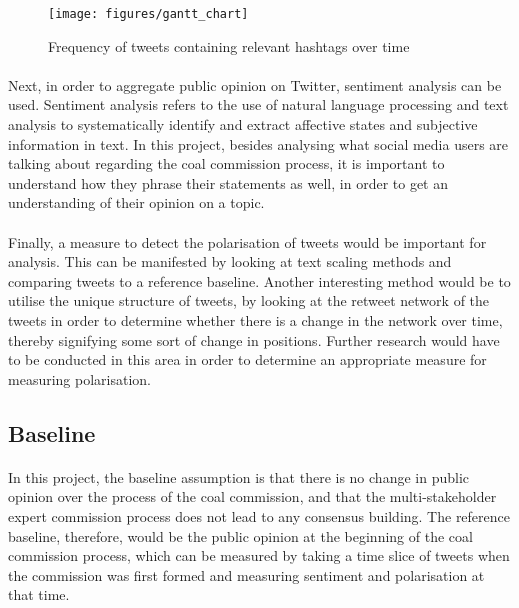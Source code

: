\documentclass[10pt,twocolumn,letterpaper]{article}
\begin{document}
\begin{figure} 
	\begin{center}
		\texttt{[image: figures/gantt\_chart]}
	\end{center}
	\caption{Frequency of tweets containing relevant hashtags over time}
	\label{fig:gantt_chart}
\end{figure}

\paragraph{} Next, in order to aggregate public opinion on Twitter, sentiment analysis can be used. Sentiment analysis refers to the use of natural language processing and text analysis to systematically identify and extract affective states and subjective information in text. In this project, besides analysing what social media users are talking about regarding the coal commission process, it is important to understand how they phrase their statements as well, in order to get an understanding of their opinion on a topic. 

\paragraph{} Finally, a measure to detect the polarisation of tweets would be important for analysis. This can be manifested by looking at text scaling methods and comparing tweets to a reference baseline. Another interesting method would be to utilise the unique structure of tweets, by looking at the retweet network of the tweets in order to determine whether there is a change in the network over time, thereby signifying some sort of change in positions. Further research would have to be conducted in this area in order to determine an appropriate measure for measuring polarisation. 

\subsection{Baseline}

\paragraph{} In this project, the baseline assumption is that there is no change in public opinion over the process of the coal commission, and that the multi-stakeholder expert commission process does not lead to any consensus building. The reference baseline, therefore, would be the public opinion at the beginning of the coal commission process, which can be measured by taking a time slice of tweets when the commission was first formed and measuring sentiment and polarisation at that time. 
\end{document}
